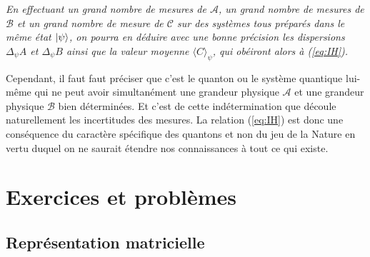 \medskip\colorbox[gray]{0.8}{
\parbox[c]{0.9\textwidth}{
\emph{En effectuant un grand nombre de mesures de $\mathcal{A}$, un grand nombre
de mesures de $\mathcal{B}$ et un grand nombre de mesure de $\mathcal{C}$ sur
des systèmes tous préparés dans le même état $\vert\psi\rangle$, on pourra en déduire
avec une bonne précision les dispersions $\Delta_{\psi}A$ et $\Delta_{\psi}B$
ainsi que la valeur moyenne $\langle C\rangle_{\psi}$, qui obéiront alors à
(\ref{eq:IH}).}
}}
\medskip

Cependant, il faut faut préciser que c'est le quanton ou le système quantique
lui-même qui ne peut avoir simultanément une grandeur physique $\mathcal{A}$
et une grandeur physique $\mathcal{B}$ bien déterminées. Et c'est de cette
indétermination que découle naturellement les incertitudes des mesures. La
relation (\ref{eq:IH}) est donc une conséquence du caractère spécifique des
quantons et non du jeu de la Nature en vertu duquel on ne saurait étendre nos
connaissances à tout ce qui existe.

\newpage


\section{Exercices et problèmes}

\subsection{Représentation matricielle}

